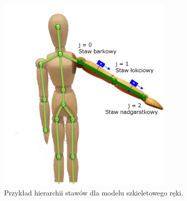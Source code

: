 \begin{figure}[!htp]
\begin{minipage}{.5\textwidth}
		\centering			
		\includegraphics[width=0.75\textwidth]{images/joints.png}
		\caption{Przykład hierarchii stawów dla modelu szkieletowego ręki.}		
		\label{fig:hybrid:jointsHierarchy}
	\end{minipage}
\end{figure}

